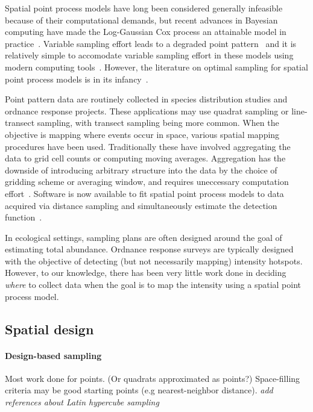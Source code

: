 \documentclass[review]{elsarticle}
\begin{document}
Spatial point process models have long been considered generally infeasible
because of their computational demands, but recent advances in Bayesian
computing have made the Log-Gaussian Cox process an attainable model in
practice~\citep{rueetal, lindgrenetal, illianetal, simpsonetal}. Variable
sampling effort leads to a degraded point pattern~\cite{chakrabortyetal} and
it is relatively simple to accomodate variable sampling effort in these models
using modern computing tools~\citep{yuanetal}. However, the literature on
optimal sampling for spatial point process models is in its
infancy~\citep{liuvanhatalo}.

Point pattern data are routinely collected in species distribution studies and
ordnance response projects. These applications may use quadrat sampling or
line-transect sampling, with transect sampling being more common. When the
objective is mapping where events occur in space, various spatial mapping
procedures have been used. Traditionally these have involved aggregating the
data to grid cell counts or computing moving averages. Aggregation has the
downside of introducing arbitrary structure into the data by the choice of
gridding scheme or averaging window, and requires uneccessary computation
effort~\citep{simpsonetal}. Software is now available to fit spatial point
process models to data acquired via distance sampling and simultaneously
estimate the detection function~\citep{dspat,baser}.

In ecological settings, sampling plans are often designed around the goal of
estimating total abundance. Ordnance response surveys are typically designed
with the objective of detecting (but not necessarily mapping) intensity
hotspots. However, to our knowledge, there has been very little work done in
deciding \emph{where} to collect data when the goal is to map the intensity
using a spatial point process model.


\subsection{Spatial design}

\paragraph{Design-based sampling}
Most work done for points. (Or quadrats approximated as points?) Space-filling
criteria may be good starting points (e.g nearest-neighbor distance).
{\it add references about Latin hypercube sampling}
\end{document}
